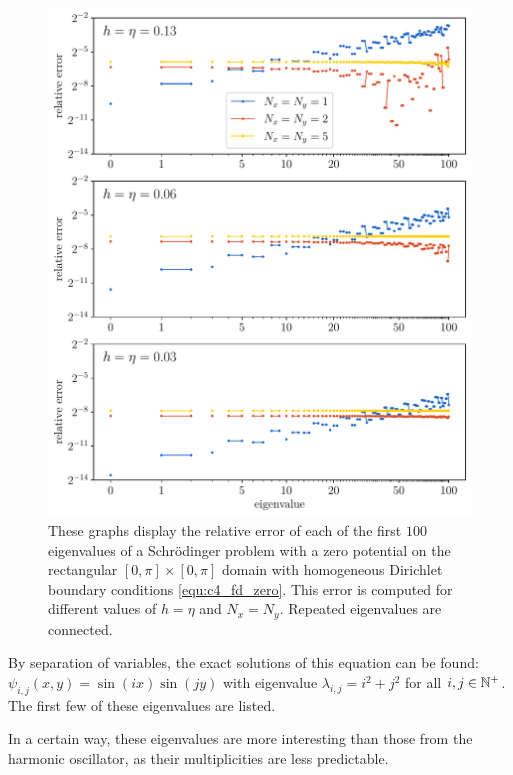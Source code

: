 \begin{figure}
    \begin{center}
        \includegraphics[width=\textwidth]{img/chapter4/fd_zero.pdf}
    \end{center}
    \caption{These graphs display the relative error of each of the first $100$ eigenvalues of a Schrödinger problem with a zero potential on the rectangular $[0, \pi] \times [0, \pi]$ domain with homogeneous Dirichlet boundary conditions \eqref{equ:c4_fd_zero}. This error is computed for different values of $h = \eta$ and $N_x = N_y$. Repeated eigenvalues are connected.}
    \label{fig:c4_fd_zero}
\end{figure}

By separation of variables, the exact solutions of this equation can be found: $\psi_{i, j}(x, y) = \sin(i x)\sin(j y)$ with eigenvalue $\lambda_{i,j} = i^2 + j^2$ for all $i, j \in \mathbb{N}^{+}$. The first few of these eigenvalues are listed.


In a certain way, these eigenvalues are more interesting than those from the harmonic oscillator, as their multiplicities are less predictable.

